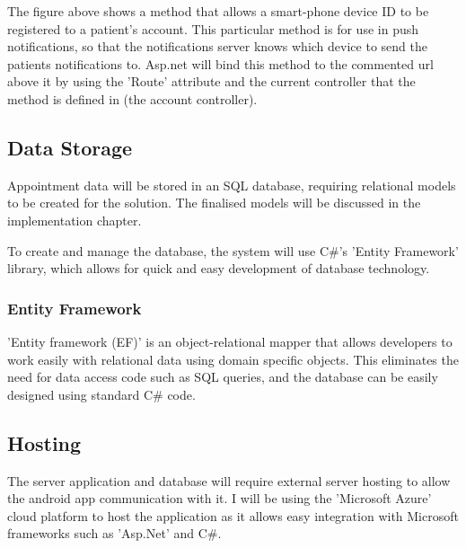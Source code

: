 The figure above shows a method that allows a smart-phone device ID to be registered to a patient's account. This particular method is for use in push notifications, so that the notifications server knows which device to send the patients notifications to. Asp.net will bind this method to the commented url above it by using the 'Route' attribute and the current controller that the method is defined in (the account controller).

\subsection{Data Storage}

Appointment data will be stored in an SQL database, requiring relational models to be created for the solution. The finalised models will be discussed in the implementation chapter.

To create and manage the database, the system will use C\#'s 'Entity Framework' library, which allows for quick and easy development of database technology.

\subsubsection{Entity Framework}

'Entity framework (EF)' is an object-relational mapper that allows developers to work easily with relational data using domain specific objects. This eliminates the need for data access code such as SQL queries, and the database can be easily designed using standard C\# code.

\subsection{Hosting}

The server application and database will require external server hosting to allow the android app communication with it. I will be using the 'Microsoft Azure' cloud platform to host the application as it allows easy integration with Microsoft frameworks such as 'Asp.Net' and C\#.

